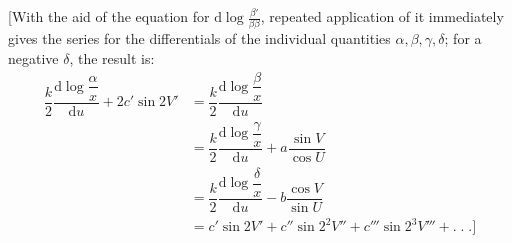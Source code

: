 [With the aid of the equation for $\mathrm{d}\log\frac{\beta'}{\beta\beta}$, repeated application of it immediately gives the series for the differentials of the individual quantities $\alpha,\allowbreak \beta,\allowbreak \gamma,\allowbreak \delta$; for a negative $\delta$, the result is:
\[
\begin{aligned}\dfrac{k}{2}\dfrac{\mathrm{d}\log\dfrac{\alpha}{x}}{\mathrm{d}u}+2c'\sin 2V'
&=\dfrac{k}{2}\dfrac{\mathrm{d}\log\dfrac{\beta}{x}}{\mathrm{d}u}
\\[7pt]&=\dfrac{k}{2}\dfrac{\mathrm{d}\log\dfrac{\gamma}{x}}{\mathrm{d}u}+a\dfrac{\sin V}{\cos U}
\\[7pt]&=\dfrac{k}{2}\dfrac{\mathrm{d}\log\dfrac{\delta}{x}}{\mathrm{d}u}-b\dfrac{\cos V}{\sin U}
\\[7pt]&=c'\sin 2V'+c''\sin 2^2V''+c'''\sin 2^3V'''+.\;.\;.\text{]}\end{aligned}
\]


